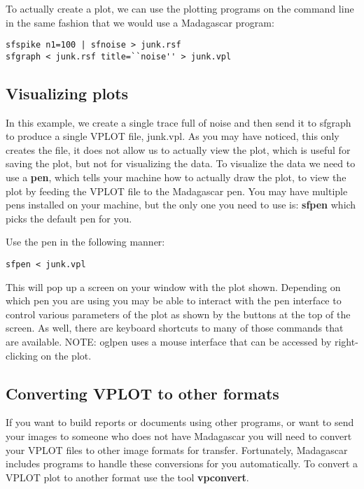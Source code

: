 To actually create a plot, we can use the plotting programs on the command line in the same fashion that we would use a Madagascar program:

\begin{verbatim}
sfspike n1=100 | sfnoise > junk.rsf
sfgraph < junk.rsf title=``noise'' > junk.vpl
\end{verbatim}

\subsection{Visualizing plots}

    In this example, we create a single trace full of noise and then send it to sfgraph to produce a single VPLOT file, junk.vpl.  As you may have noticed, this only creates the file, it does not allow us to actually view the plot, which is useful for saving the plot, but not for visualizing the data.  To visualize the data we need to use a \textbf{pen}, which tells your machine how to actually draw the plot, to view the plot by feeding the VPLOT file to the Madagascar pen. You may have multiple pens installed on your machine, but the only one you need to use is: \textbf{sfpen} which picks the default pen for you.

Use the pen in the following manner:
\begin{verbatim}
sfpen < junk.vpl
\end{verbatim}
This will pop up a screen on your window with the plot shown.  Depending on which pen you are using you may be able to interact with the pen interface to control various parameters of the plot as shown by the buttons at the top of the screen.  As well, there are keyboard shortcuts to many of those commands that are available.  NOTE: oglpen uses a mouse interface that can be accessed by right-clicking on the plot.

\subsection{Converting VPLOT to other formats}

If you want to build reports or documents using other programs, or want to send your images to someone who does not have Madagascar you will need to convert your VPLOT files to other image formats for transfer.  Fortunately, Madagascar includes programs to handle these conversions for you automatically.  To convert a VPLOT plot to another format use the tool \textbf{vpconvert}.  

